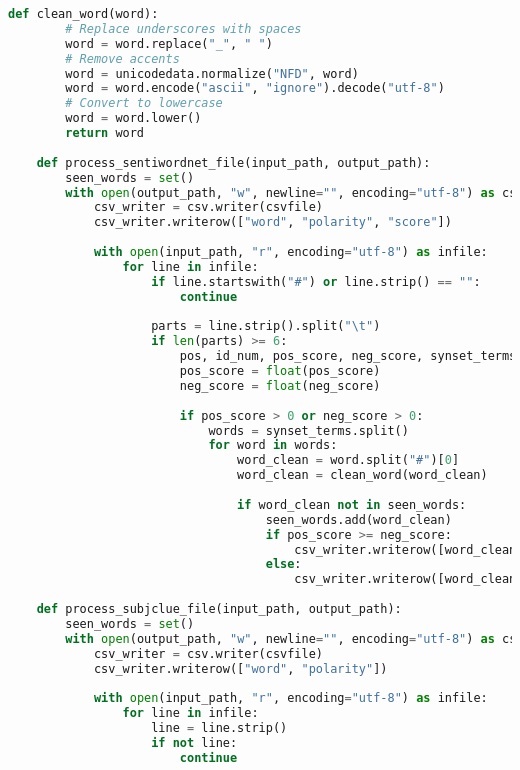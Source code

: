 \documentclass[12pt,letterpaper]{article}
\begin{document}
\begin{lstlisting}[language=Python]
    def clean_word(word):
        # Replace underscores with spaces
        word = word.replace("_", " ")
        # Remove accents
        word = unicodedata.normalize("NFD", word)
        word = word.encode("ascii", "ignore").decode("utf-8")
        # Convert to lowercase
        word = word.lower()
        return word
    
    def process_sentiwordnet_file(input_path, output_path):
        seen_words = set()
        with open(output_path, "w", newline="", encoding="utf-8") as csvfile:
            csv_writer = csv.writer(csvfile)
            csv_writer.writerow(["word", "polarity", "score"])
    
            with open(input_path, "r", encoding="utf-8") as infile:
                for line in infile:
                    if line.startswith("#") or line.strip() == "":
                        continue
    
                    parts = line.strip().split("\t")
                    if len(parts) >= 6:
                        pos, id_num, pos_score, neg_score, synset_terms, *gloss_parts = parts
                        pos_score = float(pos_score)
                        neg_score = float(neg_score)
    
                        if pos_score > 0 or neg_score > 0:
                            words = synset_terms.split()
                            for word in words:
                                word_clean = word.split("#")[0]
                                word_clean = clean_word(word_clean)
    
                                if word_clean not in seen_words:
                                    seen_words.add(word_clean)
                                    if pos_score >= neg_score:
                                        csv_writer.writerow([word_clean, "positive", pos_score])
                                    else:
                                        csv_writer.writerow([word_clean, "negative", neg_score])
    
    def process_subjclue_file(input_path, output_path):
        seen_words = set()
        with open(output_path, "w", newline="", encoding="utf-8") as csvfile:
            csv_writer = csv.writer(csvfile)
            csv_writer.writerow(["word", "polarity"])
    
            with open(input_path, "r", encoding="utf-8") as infile:
                for line in infile:
                    line = line.strip()
                    if not line:
                        continue
    

\end{lstlisting}
\end{document}
